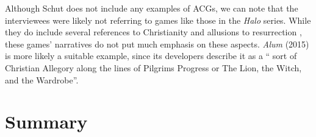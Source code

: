 Although Schut does not include any examples of \acp{ACG}, we can note that the interviewees were likely not referring to games like those in the \textit{Halo} series. While they do include several references to Christianity and allusions to resurrection \parencite{paulissen_dark_2018}, these games' narratives do not put much emphasis on these aspects. \textit{Alum} (2015) is more likely a suitable example, since its developers describe it as a `` sort of Christian Allegory along the lines of Pilgrims Progress or The Lion, the Witch, and the Wardrobe''\parencite{crashable_studios_alum_2015}.



\section{Summary}
\blindtext
